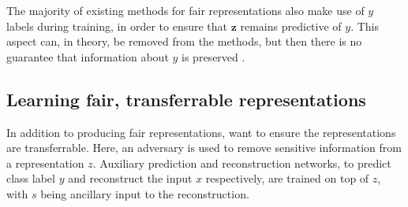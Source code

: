 The majority of existing methods for fair representations also make use of $y$ labels during training,
in order to ensure that $\bm{z}$ remains predictive of $y$.
This aspect can, in theory, be removed from the methods,
but then there is no guarantee that information about $y$ is preserved \citep{louizos2016variational}. 

\subsection{Learning fair, transferrable representations}
In addition to producing fair representations, \citet{madras2018learning} want to ensure the representations are transferrable.
Here, an adversary is used to remove sensitive information from a representation $z$.
Auxiliary prediction and reconstruction networks, to predict class label $y$
and reconstruct the input $x$ respectively,
are trained on top of $z$, with $s$ being ancillary input to the reconstruction.

